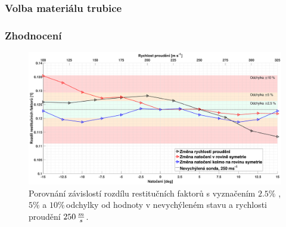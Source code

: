         \subsubsection{Volba materiálu trubice}

        \subsubsection{Zhodnocení}

            \begin{figure}[ht!]
                \centering
                \includegraphics*[width=\textwidth, trim={0.0cm 1.0cm 1.0cm 0.0cm}]{500_FINAL/final_rozdil_restitucnich_faktoru.eps}
                \caption{Porovnání závislostí rozdílu restitučních faktorů s vyznačením $2.5\%$ ,$5\%$ a $10\%$\,odchylky od hodnoty v nevychýleném stavu a rychlosti proudění $250 \, \frac{m}{s}$.}
                \label{fig:sonda-final-rozdil-restitucnich-faktoru}
            \end{figure}


        
        